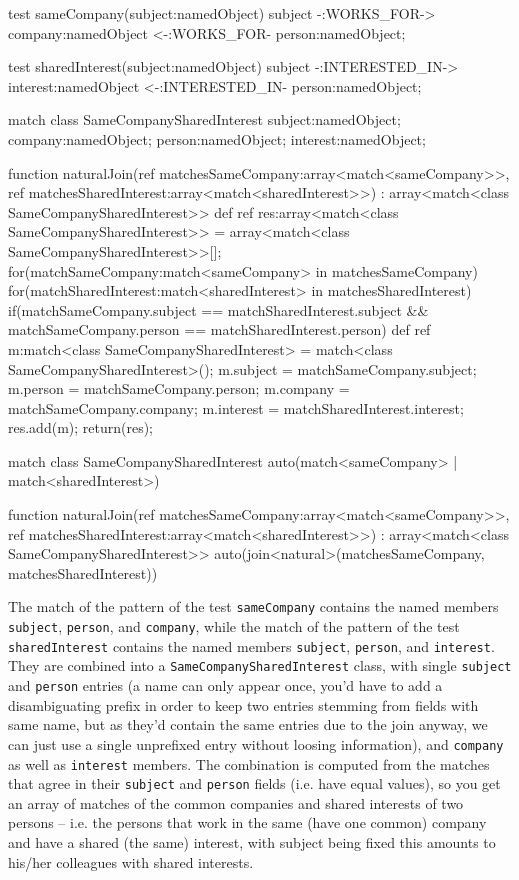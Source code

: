 \begin{example}
  \begin{grgen}
test sameCompany(subject:namedObject)
{
	subject -:WORKS_FOR-> company:namedObject <-:WORKS_FOR- person:namedObject;
}

test sharedInterest(subject:namedObject)
{
	subject -:INTERESTED_IN-> interest:namedObject <-:INTERESTED_IN- person:namedObject;
}

match class SameCompanySharedInterest
{
	subject:namedObject;
	company:namedObject;
	person:namedObject;
	interest:namedObject;
}

function naturalJoin(ref matchesSameCompany:array<match<sameCompany>>, ref matchesSharedInterest:array<match<sharedInterest>>) : array<match<class SameCompanySharedInterest>>
{
	def ref res:array<match<class SameCompanySharedInterest>> = array<match<class SameCompanySharedInterest>>[];
	for(matchSameCompany:match<sameCompany> in matchesSameCompany)
	{
		for(matchSharedInterest:match<sharedInterest> in matchesSharedInterest)
		{
			if(matchSameCompany.subject == matchSharedInterest.subject && matchSameCompany.person == matchSharedInterest.person) {
				def ref m:match<class SameCompanySharedInterest> = match<class SameCompanySharedInterest>();
				m.subject = matchSameCompany.subject;
				m.person = matchSameCompany.person;
				m.company = matchSameCompany.company;
				m.interest = matchSharedInterest.interest;
				res.add(m);
			}
		}
	}
	return(res);
}
  \end{grgen}\label{exjoins}
	
	\begin{grgen}
match class SameCompanySharedInterest
{
	auto(match<sameCompany> | match<sharedInterest>)
}

function naturalJoin(ref matchesSameCompany:array<match<sameCompany>>, ref matchesSharedInterest:array<match<sharedInterest>>) : array<match<class SameCompanySharedInterest>>
{
	auto(join<natural>(matchesSameCompany, matchesSharedInterest))
}
  \end{grgen}
\end{example}

The match of the pattern of the test \texttt{sameCompany} contains the named members \texttt{subject}, \texttt{person}, and \texttt{company}, while the match of the pattern of the test \texttt{sharedInterest} contains the named members \texttt{subject}, \texttt{person}, and \texttt{interest}.
They are combined into a \texttt{SameCompanySharedInterest} class, with single \texttt{subject} and \texttt{person} entries (a name can only appear once, you'd have to add a disambiguating prefix in order to keep two entries stemming from fields with same name, but as they'd contain the same entries due to the join anyway, we can just use a single unprefixed entry without loosing information), and \texttt{company} as well as \texttt{interest} members.
The combination is computed from the matches that agree in their \texttt{subject} and \texttt{person} fields (i.e. have equal values), so you get an array of matches of the common companies and shared interests of two persons -- i.e. the persons that work in the same (have one common) company and have a shared (the same) interest, with subject being fixed this amounts to his/her colleagues with shared interests.

